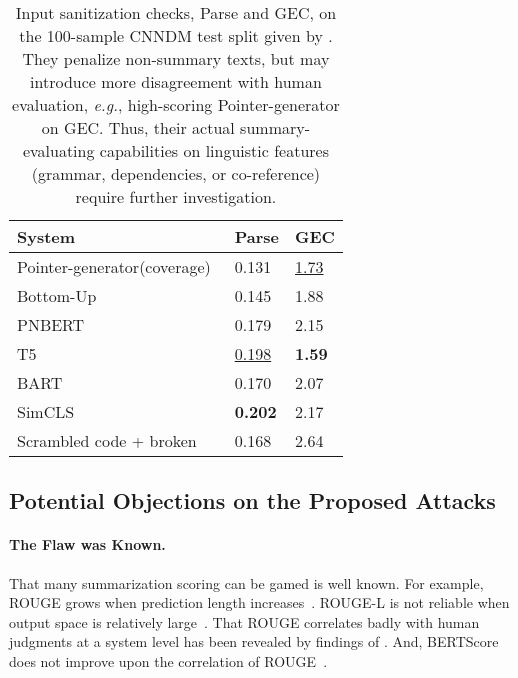 \documentclass[11pt]{article}
\theoremstyle{remark}
\begin{document}
\begin{table}[t]
\centering
\scriptsize
\begin{tabularx}{0.5\textwidth}{Xll}
\hline
System                                           & Parse & GEC \\
\hline
Pointer-generator(coverage)~\cite{see-etal-2017-get}           & 0.131          & \underline{1.73}         \\ 
Bottom-Up~\cite{gehrmann-etal-2018-bottom}                     & 0.145          & 1.88        \\
PNBERT~\cite{zhong-etal-2020-extractive}                     & 0.179          & 2.15            \\
T5~\cite{raffel2019exploring}                        & \underline{0.198}          & \textbf{1.59} \\
BART~\cite{lewis-etal-2020-bart}                         & 0.170          & 2.07          \\
SimCLS~\cite{liu-liu-2021-simcls}                         & \textbf{0.202} & 2.17        \\
\hline
Scrambled code + broken                         & 0.168          & 2.64      \\
\hline

\end{tabularx}
\caption{\label{tab:defence}
Input sanitization checks, Parse and GEC, on the 100-sample CNNDM test split given by \citet{graham-2015-evaluating}. They penalize non-summary texts, but may introduce more disagreement with human evaluation, \emph{e.g.}, high-scoring Pointer-generator on GEC. Thus, their actual summary-evaluating capabilities on linguistic features (grammar, dependencies, or co-reference) require further investigation.
}
\end{table}

\subsection{Potential Objections on the Proposed Attacks}
\paragraph{The Flaw was Known.}
That many summarization scoring can be gamed is well known. For example, ROUGE grows when prediction length increases~\cite{sun-etal-2019-compare}. ROUGE-L is not reliable when output space is relatively large~\cite{krishna-etal-2021-hurdles}. That ROUGE correlates badly with human judgments at a system level has been revealed by findings of \citeauthor{paulus2018a}. And, BERTScore does not improve upon the correlation of ROUGE~\cite{fabbri-etal-2021-summeval,gehrmann-etal-2021-gem}.
\end{document}
